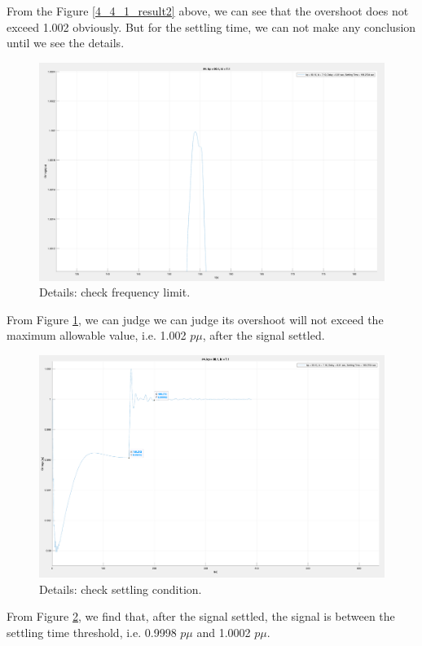 \documentclass{report}
\begin{document}
From the Figure \textcolor{red}{\ref{4_4_1_result2}} above, we can see that the overshoot does not exceed 1.002 obviously. But for the settling time, we can not make any conclusion until we see the details. \\


\begin{figure}[htbp]
\centering
\includegraphics[width = .819\textwidth]{figure/4_4_1_result3.png}
\caption{Details: check frequency limit.}
\label{4_4_1_result3}
\end{figure}

From Figure \textcolor{red}{\ref{4_4_1_result3}}, we can judge we can judge its overshoot will not exceed the maximum allowable value, i.e. 1.002 $p\mu$, after the signal settled.\\

\begin{figure}[htbp]
\centering
\includegraphics[width = .819\textwidth]{figure/4_4_1_result4.png}
\caption{Details: check settling condition.}
\label{4_4_1_result4}
\end{figure}


From Figure \textcolor{red}{\ref{4_4_1_result4}}, we find that, after the signal settled, the signal is between the settling time threshold, i.e. 0.9998 $p\mu$ and 1.0002 $p\mu$.\\
\end{document}
